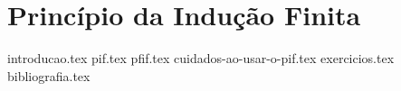 \chapter{Princípio da Indução Finita}
{
    \newcommand{\chapterdir}{./sections/}

    {introducao.tex}
    {pif.tex}
    {pfif.tex}
    {cuidados-ao-usar-o-pif.tex}
    {exercicios.tex}
    {bibliografia.tex}
}